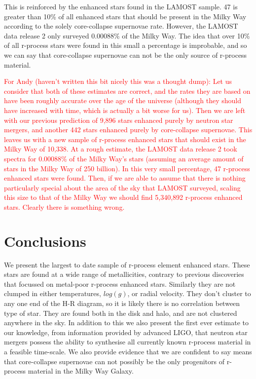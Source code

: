 \documentclass[a4paper,fleqn,usenatbib]{mnras}
\newcommand{\todo}[1]{\textcolor{red}{#1}}
\begin{document}
    This is reinforced by the enhanced stars found in the LAMOST sample. 47 is greater than 10\% of all enhanced stars that should be present in the Milky Way according to the solely core-collapse supernovae rate. However, the LAMOST data release 2 only surveyed 0.00088\% of the Milky Way. The idea that over 10\% of all r-process stars were found in this small a percentage is improbable, and so we can say that core-collapse supernovae can not be the only source of r-process material. 
    
    \todo{For Andy (haven't written this bit nicely this was a thought dump): Let us consider that both of these estimates are correct, and the rates they are based on have been roughly accurate over the age of the universe (although they should have increased with time, which is actually a bit worse for us). Then we are left with our previous prediction of 9,896 stars enhanced purely by neutron star mergers, and another 442 stars enhanced purely by core-collapse supernovae. This leaves us with a new sample of r-process enhanced stars that should exist in the Milky Way of 10,338. 
    At a rough estimate, the LAMOST data release 2 took spectra for 0.00088\% of the Milky Way's stars (assuming an average amount of stars in the Milky Way of 250 billion). In this very small percentage, 47 r-process enhanced stars were found. Then, if we are able to assume that there is nothing particularly special about the area of the sky that LAMOST surveyed, scaling this size to that of the Milky Way we should find 5,340,892 r-process enhanced stars. Clearly there is something wrong.}
    
	
	\section{Conclusions}
	We present the largest to date sample of r-process element enhanced stars. These stars are found at a wide range of metallicities, contrary to previous discoveries that focussed on metal-poor r-process enhanced stars. Similarly they are not clumped in either temperatures, $log(g)$, or radial velocity. They don't cluster to any one end of the H-R diagram, so it is likely there is no correlation between type of star. They are found both in the disk and halo, and are not clustered anywhere in the sky. In addition to this we also present the first ever estimate to our knowledge, from information provided by advanced LIGO, that neutron star mergers possess the ability to synthesise all currently known r-process material in a feasible time-scale. We also provide evidence that we are confident to say means that core-collapse supernovae can not possibly be the only progenitors of r-process material in the Milky Way Galaxy.
	
\end{document}
